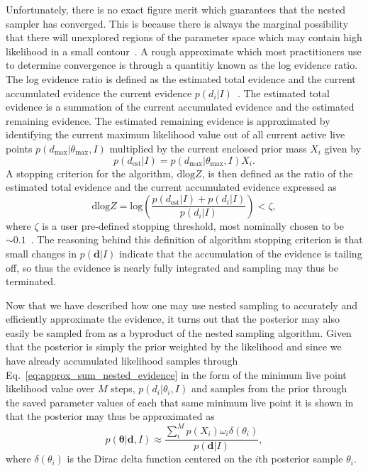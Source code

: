 %
%
Unfortunately, there is no exact figure merit which guarantees 
that the nested sampler has converged. This is because there is always 
the marginal possibility that there will unexplored regions of 
the parameter space which may contain high likelihood in a small 
contour~\cite{skilling2006}. A rough approximate which 
most practitioners use to 
determine convergence is through a quantitiy known as the log evidence 
ratio. The log evidence ratio is defined as the  
estimated total evidence and the current accumulated evidence the 
current evidence $p(d_i|I)$~\cite{2021ascl.soft03022B}. The estimated 
total evidence is a summation of the current accumulated evidence 
and the estimated remaining evidence. The estimated remaining 
evidence is approximated by identifying the current maximum likelihood 
value out of all current active live points 
$p(d_{\mathrm{max}}|\theta_{\mathrm{max}},I)$ multiplied by the current 
enclosed prior mass $X_i$ given by
%
\begin{equation}
    p(d_{\mathrm{est}}|I) = p(d_{\mathrm{max}}|\theta_{\mathrm{max}},I) 
    X_i.
\end{equation}
%
A stopping criterion for the algorithm, $\mathrm{dlog}Z$, is then 
defined as the ratio 
of the estimated total evidence and the current accumulated 
evidence expressed as
%
\begin{equation}
    \mathrm{dlog}Z = \mathrm{log}\left(\frac{p(d_{\mathrm{est}}|I) + 
    p(d_i|I)}{p(d_i|I)}\right) < \zeta,
\end{equation}
%
where $\zeta$ is a user pre-defined stopping 
threshold, most nominally chosen to be $\sim 0.1$~\cite{2021ascl.soft03022B}.
The reasoning behind this definition of algorithm stopping criterion is that 
small changes in $p(\bm{d}|I)$ indicate that 
the accumulation of the evidence is tailing off, so thus the evidence 
is nearly fully integrated and sampling may thus be terminated.

%
%
Now that we have described how one may use nested sampling 
to accurately and efficiently approximate the evidence, it turns 
out that the posterior may also easily be sampled from as a byproduct 
of the nested sampling algorithm. Given that the posterior 
is simply the prior weighted by the likelihood and since 
we have already accumulated likelihood samples through 
Eq.~\ref{eq:approx_sum_nested_evidence} in the form of the 
minimum live point likelihood value over $M$ steps, $p(d_i|\theta_i,I)$ 
and samples from the prior through the saved parameter values of 
each that same minimum live point it is 
shown in~\cite{10.1111/j.1365-2966.2011.20288.x,1409.7215} that the 
posterior may thus be approximated as
%
\begin{equation}
    p(\bm{\theta}|\bm{d},I) \approx \frac{ \sum_{i}^{M} p(X_i) \omega_i  \delta(\theta_i)}{p(\bm{d}|I)}, 
\end{equation}
%
where $\delta(\theta_i)$ is the Dirac delta function centered on 
the $i$th posterior sample $\theta_i$.


